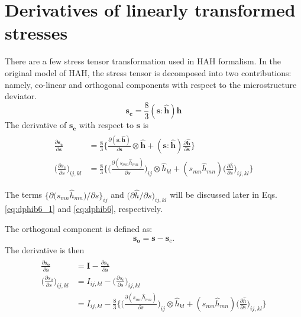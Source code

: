 \documentclass[12pt]{amsart}
\begin{document}
\section{Derivatives of linearly transformed stresses}
\label{sec:stress_deriv}


There are a few stress tensor transformation used in HAH formalism.
In the original model of HAH, the stress tensor is decomposed into two contributions: namely, co-linear and orthogonal components with respect to the microstructure deviator.
\begin{equation}
  \label{eq:decomp1}
  \mathbf{s_c} = \frac{8}{3} (\mathbf{s}:\hat{\mathbf{h}}) \mathbf{h}
\end{equation}
The derivative of $\mathbf{s_c}$ with respect to $\mathbf{s}$ is
\begin{eqnarray}
  \begin{split}
  \label{eq:decomp2}
  \frac{\partial\mathbf{s_c}}{\partial\mathbf{s}}&= \frac{8}{3}\bigg\{  \frac{\partial(\mathbf{s}:\hat{\mathbf{h}})}{\partial\mathbf{s}} \otimes \hat{\mathbf{h}}+ (\mathbf{s}:\hat{\mathbf{h}}) \frac{\partial\hat{\mathbf{h}}}{\partial\mathbf{s}}  \bigg\} \\
  \bigg( \frac{\partial s_c}{\partial s}\bigg)_{ij,kl} &= \frac{8}{3}\Bigg\{ \bigg(\frac{\partial(s_{mn}\hat{h}_{mn})}{\partial s}\bigg)_{ij} \otimes \hat{h}_{kl}+ (s_{mn}\hat{h}_{mn}) \bigg(\frac{\partial\hat{h}}{\partial s}\bigg)_{ij,kl}  \Bigg\}
  \end{split}
\end{eqnarray}

The terms $\big\{\partial \big( s_{mn} \hat{h}_{mn} \big)/ \partial s\big\}_{ij}$ and $\big(\partial \hat{h}/\partial s\big)_{ij,kl}$ will be discussed later in Eqs. \ref{eq:dphib6_1} and \ref{eq:dphib6}, respectively.

The orthogonal component is defined as:
\begin{eqnarray}
  \label{eq:decomp3}
  \mathbf{s_o} = \mathbf{s} - \mathbf{s}_c.
\end{eqnarray}
The derivative is then
\begin{eqnarray}
  \label{eq:decomp4}
  \begin{split}
    \frac{\partial\mathbf{s_o}}{\partial\mathbf{s}} &= \mathbf{I} -   \frac{\partial\mathbf{s_c}}{\partial\mathbf{s}}\\
    \bigg(\frac{\partial s_o}{\partial s}\bigg)_{ij,kl} &= I_{ij,kl} -   \bigg(\frac{\partial s_c}{\partial s}\bigg)_{ij,kl}\\
     &= I_{ij,kl} -  \frac{8}{3}\bigg\{ \bigg(\frac{\partial(s_{mn}\hat{h}_{mn})}{\partial s}\bigg)_{ij} \otimes \hat{h}_{kl}+ (s_{mn}\hat{h}_{mn}) \bigg(\frac{\partial\hat{h}}{\partial s}\bigg)_{ij,kl}  \bigg\}
  \end{split}
\end{eqnarray}
\end{document}
